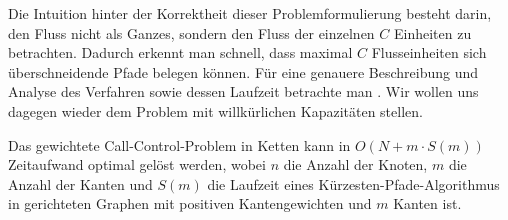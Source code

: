 Die Intuition hinter der Korrektheit dieser Problemformulierung besteht darin, den Fluss nicht als Ganzes, sondern
den Fluss der einzelnen $C$ Einheiten zu betrachten.
Dadurch erkennt man schnell, dass maximal $C$ Flusseinheiten sich überschneidende Pfade belegen können.
Für eine genauere Beschreibung und Analyse des Verfahren sowie dessen Laufzeit betrachte man .
Wir wollen uns dagegen wieder dem Problem mit willkürlichen Kapazitäten stellen.

\begin{theorem}
    Das gewichtete Call-Control-Problem in Ketten kann in $O(N + m\cdot S(m))$ Zeitaufwand optimal gelöst werden,
    wobei $n$ die Anzahl der Knoten, $m$ die Anzahl der Kanten und $S(m)$ die Laufzeit eines Kürzesten-Pfade-Algorithmus
    in gerichteten Graphen mit positiven Kantengewichten und $m$ Kanten ist.
\end{theorem}

